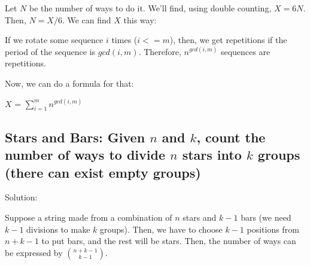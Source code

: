 \documentclass[12pt]{article}%
\begin{document}
Let $N$ be the number of ways to do it. We'll find, using double counting, $X = 6N$. Then, $N = X/6$. We can find $X$ this way:

If we rotate some sequence $i$ times ($i <= m$), then, we get repetitions if the period of the sequence is $gcd(i,m)$. Therefore, $n^{gcd(i,m)}$ sequences are repetitions.

Now, we can do a formula for that:

$X$ = $\sum_{i = 1}^{m} n^{gcd(i,m)}$

\subsection{Stars and Bars: Given $n$ and $k$, count the number of ways to divide $n$ stars into $k$ groups (there can exist empty groups)}

Solution:

Suppose a string made from a combination of $n$ stars and $k-1$ bars (we need $k-1$ divisions to make $k$ groups). Then, we have to choose $k-1$ positions from $n+k-1$ to put bars, and the rest will be stars. Then, the number of ways can be expressed by ${n+k-1}\choose{k-1}$.    
\end{document}
